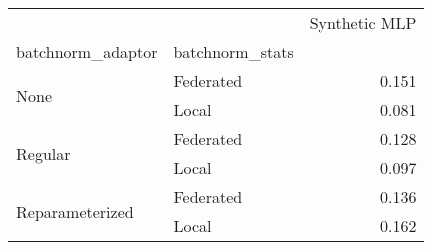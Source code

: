 \begin{tabular}{llr}
\toprule
 &  & Synthetic MLP \\
batchnorm_adaptor & batchnorm_stats &  \\
\midrule
\multirow[t]{2}{*}{None} & Federated & 0.151 \\
 & Local & 0.081 \\
\cline{1-3}
\multirow[t]{2}{*}{Regular} & Federated & 0.128 \\
 & Local & 0.097 \\
\cline{1-3}
\multirow[t]{2}{*}{Reparameterized} & Federated & 0.136 \\
 & Local & 0.162 \\
\cline{1-3}
\bottomrule
\end{tabular}
